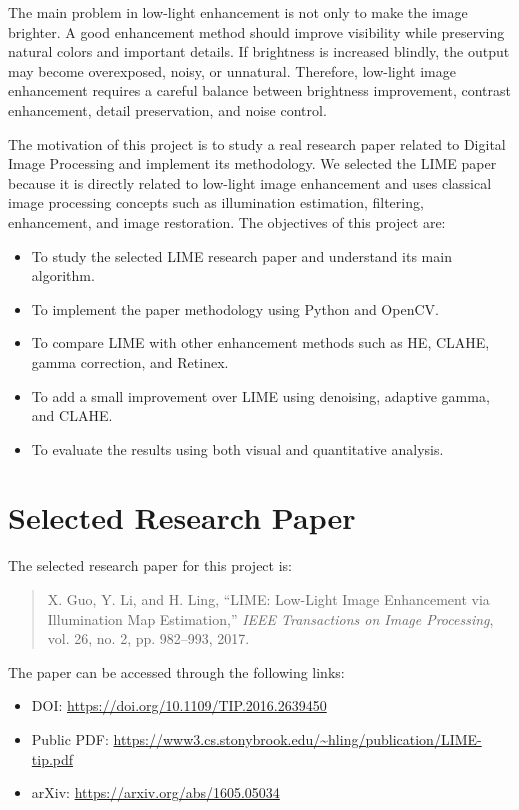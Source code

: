 \documentclass[11pt]{article}
\begin{document}
The main problem in low-light enhancement is not only to make the image brighter. A good enhancement method should improve visibility while preserving natural colors and important details. If brightness is increased blindly, the output may become overexposed, noisy, or unnatural. Therefore, low-light image enhancement requires a careful balance between brightness improvement, contrast enhancement, detail preservation, and noise control.

The motivation of this project is to study a real research paper related to Digital Image Processing and implement its methodology. We selected the LIME paper because it is directly related to low-light image enhancement and uses classical image processing concepts such as illumination estimation, filtering, enhancement, and image restoration. The objectives of this project are:

\begin{itemize}
    \item To study the selected LIME research paper and understand its main algorithm.
    \item To implement the paper methodology using Python and OpenCV.
    \item To compare LIME with other enhancement methods such as HE, CLAHE, gamma correction, and Retinex.
    \item To add a small improvement over LIME using denoising, adaptive gamma, and CLAHE.
    \item To evaluate the results using both visual and quantitative analysis.
\end{itemize}

\section{Selected Research Paper}
The selected research paper for this project is:

\begin{quote}
X. Guo, Y. Li, and H. Ling, ``LIME: Low-Light Image Enhancement via Illumination Map Estimation,'' \textit{IEEE Transactions on Image Processing}, vol. 26, no. 2, pp. 982--993, 2017.
\end{quote}

The paper can be accessed through the following links:
\begin{itemize}
    \item DOI: \url{https://doi.org/10.1109/TIP.2016.2639450}
    \item Public PDF: \url{https://www3.cs.stonybrook.edu/~hling/publication/LIME-tip.pdf}
    \item arXiv: \url{https://arxiv.org/abs/1605.05034}
\end{itemize}
\end{document}
